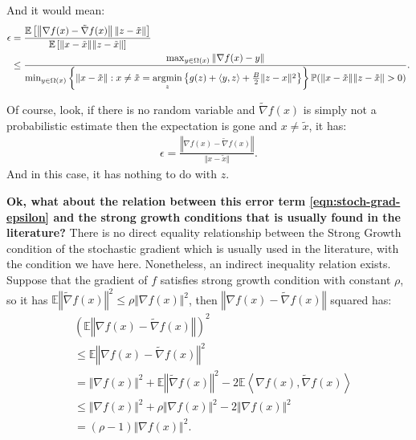 \documentclass[12pt]{article}
\newcommand{\expect}{\ensuremath{\mathbb E}}
\newcommand{\prob}{\ensuremath{\mathbb P}}
\begin{document}
        And it would mean: 
        {\small
        \begin{align*}
            \epsilon &= 
            \frac{
                \expect \left[
                    \left\Vert  \nabla f(x) - \tilde \nabla f(x) \right\Vert \Vert z - \tilde x\Vert
                \right]
            }{
            \expect \left[
                \Vert x - \tilde x\Vert\Vert z - \tilde x\Vert
            \right]
            }\\
            &\le \frac{
                \max_{y \in \Omega(x)}\Vert \nabla f(x) - y\Vert 
            }{
                \min_{y \in \Omega(x)}\left\lbrace
                    \Vert x - \tilde x\Vert:
                    x\neq \tilde x = \argmin_{z}\left\lbrace
                    g(z) + \langle y, z\rangle + \frac{B}{2}\Vert z - x\Vert^2
                \right\rbrace
                \right\rbrace
                \prob(
                    \Vert x - \tilde x\Vert\Vert z - \tilde x\Vert > 0
                )
            }. 
        \end{align*}
        }
        \par
        Of course, look, if there is no random variable and $\tilde \nabla f(x)$ is simply not a probabilistic estimate then the expectation is gone and $x\neq \tilde x$, it has: 
        \begin{align*}
            \epsilon = \frac{\left\Vert
                \nabla f(x) - \tilde \nabla f(x)
            \right\Vert}{\Vert x - \tilde x\Vert}.
        \end{align*}
        And in this case, it has nothing to do with $z$. 
        \par
        \textbf{Ok, what about the relation between this error term \eqref{eqn:stoch-grad-epsilon} and the strong growth conditions that is usually found in the literature?}
        There is no direct equality relationship between the Strong Growth condition of the stochastic gradient which is usually used in the literature, with the condition we have here. 
        Nonetheless, an indirect inequality relation exists. 
        Suppose that the gradient of $f$ satisfies strong growth condition with constant $\rho$, so it has $\expect \left\Vert \tilde \nabla f(x)\right\Vert^2 \le \rho \Vert \nabla f(x)\Vert^2$, then $\left\Vert \nabla f(x) - \tilde \nabla f(x)\right\Vert$ squared has: 
        \begin{align*}
            & \left(
                \expect \left \Vert \nabla f(x) - \tilde \nabla f(x)\right\Vert
            \right)^2
            \\
            &\le 
            \expect \left\Vert \nabla f(x) - \tilde \nabla f(x)\right\Vert^2
            \\
            &= 
            \Vert \nabla f(x)\Vert^2 
            + \expect \left\Vert\tilde \nabla f(x) \right\Vert^2 
            - 2\expect
            \left\langle 
                \nabla f(x), \tilde \nabla f(x)
            \right\rangle
            \\
            &\le 
            \Vert \nabla f(x)\Vert^2 
            + \rho \Vert \nabla f(x)\Vert^2
            - 2\Vert \nabla f(x)\Vert^2
            \\
            &= \left(\rho - 1\right) \Vert \nabla f(x)\Vert^2.
        \end{align*}
\end{document}
